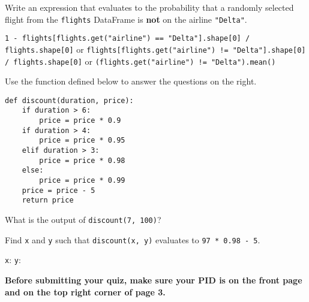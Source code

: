 \documentclass[twoside,12pt]{article}
\begin{document}
\begin{probset}
\begin{prob}
\begin{subprobset}
\begin{subprob}
\end{subprob}

\begin{subprob}

Write an expression that evaluates to the probability that a randomly selected flight from the \texttt{flights} DataFrame is \textbf{not} on the airline \texttt{"Delta"}.

\begin{responsebox}{0.5in}
\texttt{1 - flights[flights.get("airline") == "Delta"].shape[0] / flights.shape[0]} or 
\texttt{flights[flights.get("airline") != "Delta"].shape[0] / flights.shape[0]} or
\texttt{(flights.get("airline") != "Delta").mean()}
\end{responsebox}

\end{subprob}
\end{subprobset}
\end{prob}
\vspace{-0.15in}
\begin{prob}

Use the function defined below to answer the questions on the right.



\begin{minipage}[t]{2.8in}
\begin{verbatim}
def discount(duration, price):
    if duration > 6:
        price = price * 0.9
    if duration > 4:
        price = price * 0.95 
    elif duration > 3:
        price = price * 0.98
    else:
        price = price * 0.99 
    price = price - 5 
    return price
\end{verbatim}
\end{minipage} \hspace{0.25in}
\begin{minipage}[t]{3.5in}
\begin{subprobset}
    \begin{subprob}
    What is the output of \texttt{discount(7, 100)}?




    \end{subprob}
    \begin{subprob}
        Find \texttt{x} and \texttt{y} such that \texttt{discount(x, y)} evaluates to \texttt{97 * 0.98 - 5}.
    \end{subprob}
    
    \texttt{x}: \inlineresponsebox[1in]{anything in \texttt{(3, 4]}}{}
\texttt{y}: 
\end{subprobset}
\end{minipage}
\end{prob}

\end{probset}

\newpage

\begin{center}
\textbf{Before submitting your quiz, make sure your PID is on the front page and on the top right corner of page 3.}
\end{center}
\end{document}
